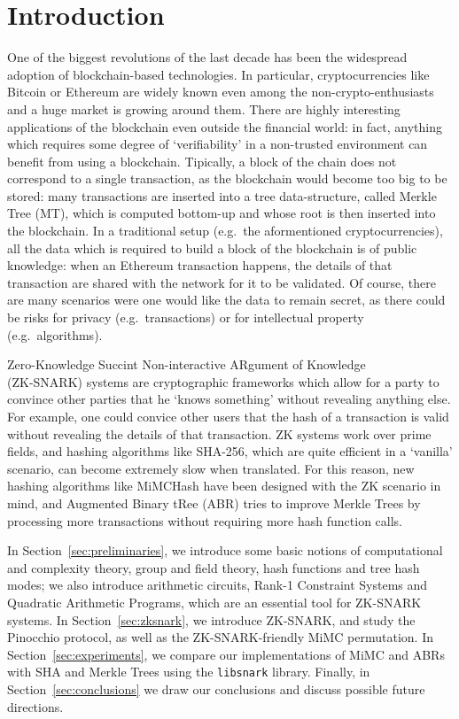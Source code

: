 \section{Introduction}
One of the biggest revolutions of the last decade has been the widespread adoption of
blockchain-based technologies. In particular, cryptocurrencies like Bitcoin or Ethereum are
widely known even among the non-crypto-enthusiasts and a huge market is growing around them.
There are highly interesting applications of the blockchain even outside the financial world:
in fact, anything which requires some degree of `verifiability' in a non-trusted environment can
benefit from using a blockchain.
Tipically, a block of the chain does not correspond to a single transaction, as the blockchain
would become too big to be stored: many transactions are inserted into a tree data-structure,
called Merkle Tree (MT), which is computed bottom-up and whose root is then inserted into the blockchain.
In a traditional setup (e.g.\ the aformentioned cryptocurrencies), all the data which is required
to build a block of the blockchain is of public knowledge: when an Ethereum transaction happens,
the details of that transaction are shared with the network for it to be validated.
Of course, there are many scenarios were one would like the data to remain secret, as there could
be risks for privacy (e.g.\ transactions) or for intellectual property (e.g.\ algorithms).

Zero-Knowledge Succint Non-interactive ARgument of Knowledge\\ (ZK-SNARK) systems are cryptographic
frameworks which allow for a party to convince other parties that he `knows something' without
revealing anything else.
For example, one could convice other users that the hash of a transaction is valid without
revealing the details of that transaction.
ZK systems work over prime fields, and hashing algorithms like SHA-256, which are quite efficient
in a `vanilla' scenario, can become extremely slow when translated.
For this reason, new hashing algorithms like MiMCHash have been designed with the ZK scenario in
mind, and Augmented Binary tRee (ABR) tries to improve Merkle Trees by processing more transactions
without requiring more hash function calls.

In Section~\ref{sec:preliminaries}, we introduce some basic notions of computational and complexity
theory, group and field theory, hash functions and tree hash modes; we also introduce arithmetic
circuits, Rank-1 Constraint Systems and Quadratic Arithmetic Programs, which are an essential tool
for ZK-SNARK systems.
In Section~\ref{sec:zksnark}, we introduce ZK-SNARK, and study the Pinocchio protocol, as well
as the ZK-SNARK-friendly MiMC permutation.
In Section~\ref{sec:experiments}, we compare our implementations of MiMC and ABRs with SHA and
Merkle Trees using the \texttt{libsnark} library.
Finally, in Section~\ref{sec:conclusions} we draw our conclusions and discuss possible future
directions.
